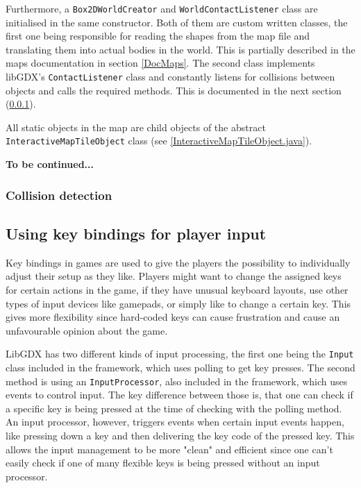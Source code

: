 \documentclass[12p]{article}
\begin{document}

Furthermore, a \texttt{Box2DWorldCreator} and \texttt{WorldContactListener} class are initialised in the same constructor. Both of them are custom written classes, the first one being responsible for reading the shapes from the map file and translating them into actual bodies in the world. This is partially described in the maps documentation in section \ref{DocMaps}. The second class implements libGDX's \texttt{ContactListener} class and constantly listens for collisions between objects and calls the required methods. This is documented in the next section (\ref{DocCollisionDetection}).

All static objects in the map are child objects of the abstract \texttt{InteractiveMapTileObject} class (see \ref{InteractiveMapTileObject.java}).

\textbf{To be continued...}

\subsubsection{Collision detection} \label{DocCollisionDetection}
 

\subsection{Using key bindings for player input} \label{DocKeyBindings}

Key bindings in games are used to give the players the possibility to individually adjust their setup as they like. Players might want to change the assigned keys for certain actions in the game, if they have unusual keyboard layouts, use other types of input devices like gamepads, or simply like to change a certain key. This gives more flexibility since hard-coded keys can cause frustration and cause an unfavourable opinion about the game.

LibGDX has two different kinds of input processing, the first one being the \texttt{Input} class included in the framework, which uses polling to get key presses. The second method is using an \texttt{InputProcessor}, also included in the framework, which uses events to control input. The key difference between those is, that one can check if a specific key is being pressed at the time of checking with the polling method. An input processor, however, triggers events when certain input events happen, like pressing down a key and then delivering the key code of the pressed key. This allows the input management to be more "clean" and efficient since one can't easily check if one of many flexible keys is being pressed without an input processor.
\end{document}
